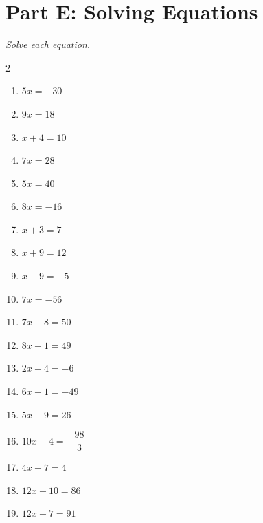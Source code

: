 \documentclass[11pt]{article}
\begin{document}
\section*{Part E: Solving Equations}
\noindent\textit{Solve each equation.}
\begin{multicols}{2}
\begin{enumerate}
  \item $5x = -30$
  \vspace{1.4cm}
  \item $9x = 18$
  \vspace{1.4cm}
  \item $x + 4 = 10$
  \vspace{1.4cm}
  \item $7x = 28$
  \vspace{1.4cm}
  \item $5x = 40$
  \vspace{1.4cm}
  \item $8x = -16$
  \vspace{1.4cm}
  \item $x + 3 = 7$
  \vspace{1.4cm}
  \item $x + 9 = 12$
  \vspace{1.4cm}
  \item $x - 9 = -5$
  \vspace{1.4cm}
  \item $7x = -56$
  \vspace{1.4cm}
  \item $7x + 8 = 50$
  \vspace{1.4cm}
  \item $8x + 1 = 49$
  \vspace{1.4cm}
  \item $2x - 4 = -6$
  \vspace{1.4cm}
  \item $6x - 1 = -49$
  \vspace{1.4cm}
  \item $5x - 9 = 26$
  \vspace{1.4cm}
  \item $10x + 4 = -\dfrac{98}{3}$
  \vspace{1.4cm}
  \item $4x - 7 = 4$
  \vspace{1.4cm}
  \item $12x - 10 = 86$
  \vspace{1.4cm}
  \item $12x + 7 = 91$
  \vspace{1.4cm}

\end{enumerate}
\end{multicols}
\end{document}
